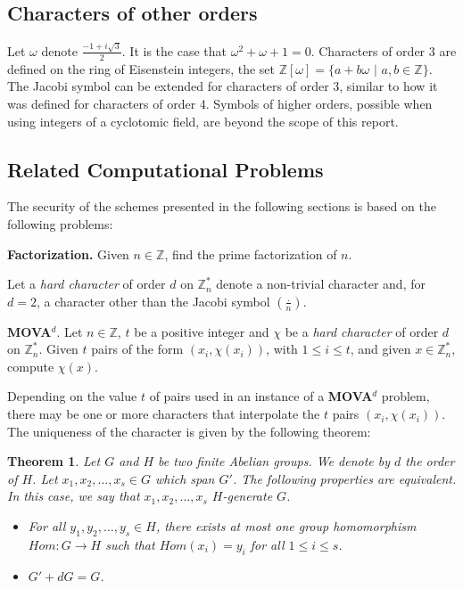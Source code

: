 \documentclass[11pt, a4paper, twoside, openright]{report}
\newtheorem{theorem}{Theorem}
\begin{document}
 		
 	\subsection{Characters of other orders}
 	
 		Let $\omega$ denote $\frac{-1+i\sqrt{3}}{2}$. It is the case that $\omega^2 + \omega+1=0$. Characters of order 3 
 	 	are defined on the ring of Eisenstein integers, the set $\mathbb{Z}[\omega]= \{ a +b\omega$ $|$ $a,b \in \mathbb{Z} \}$.
 	 	The Jacobi symbol can be extended for characters of order 3, similar to how it was defined for characters of order 4. 
 	 	Symbols of higher orders, possible when using integers of a cyclotomic field, are beyond the scope 
 	 	of this report.
 	
 	\subsection{Related Computational Problems}	
 		
 		The security of the schemes presented in the following sections is based on the following problems: 
 		
 		\textbf{Factorization.} Given $n \in \mathbb{Z}$, find the prime factorization of $n$.
 		
 			Let a \textit{hard character} of order $d$ on $\mathbb{Z}_n^*$ denote a non-trivial character and, for $d=2$,   a character  other than  the Jacobi symbol $(\frac{.}{n})$. 
 			
 		 		\textbf{MOVA$^d$}. Let $n \in \mathbb{Z}$, $t$ be a positive integer and $\chi$ be a \textit{hard character} of order 
 		 		$d$ on $\mathbb{Z}_n^*$. Given $t$ pairs of the form $(x_i, \chi(x_i))$, with $1 \leq i \leq t$, and given $x \in \mathbb{Z}_n^*$, 	compute $\chi(x)$. 
  		 
		Depending on the value $t$ of pairs used in an instance of a \textbf{MOVA$^d$} problem, there may be one or more characters that interpolate
		 the $t$ pairs $(x_i, \chi(x_i))$. The uniqueness of the character is given by the following theorem: 

		\begin{theorem}
			Let $G$ and $H$ be two finite Abelian groups. We denote by $d$ the order of $H$. Let $x_1, x_2, \ldots, x_s \in G$
			which span $G'$. The following properties are equivalent. In this case, we say that  $x_1, x_2, \ldots, x_s$ $H$-generate
			$G$. 
			\begin{itemize}
				\item For all $y_1, y_2, \ldots, y_s \in H$, there exists at most one group homomorphism $Hom : G \rightarrow H$
					such that $Hom(x_i) = y_i$ for all $1 \leq i \leq s$.
				\item $G' + dG = G$.
			\end{itemize}
		\end{theorem} 
\end{document}
